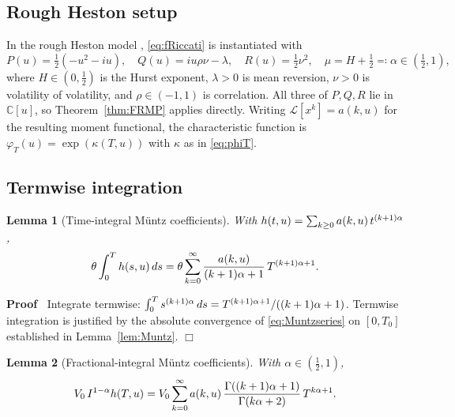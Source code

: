 \documentclass{article}
\newenvironment{proof}{\noindent\textbf{Proof\ }}{\hspace*{\fill}$\Box$\medskip}
\newtheorem{lemma}{Lemma}
\newcommand{\C}{\mathbb{C}}
\newcommand{\Lk}{\mathcal{L}}
\begin{document}
\subsection{Rough Heston setup}

In the rough Heston model {\cite{ElEuchRosenbaum2019}}, \eqref{eq:fRiccati} is
instantiated with
\begin{equation}
  P (u) = \tfrac{1}{2} (- u^2 - iu), \quad Q (u) = iu \rho \nu - \lambda,
  \quad R (u) = \tfrac{1}{2} \nu^2, \quad \mu = H + \tfrac{1}{2} \eqqcolon
  \alpha \in (\tfrac{1}{2}, 1), \label{eq:roughHparams}
\end{equation}
where $H \in (0, \tfrac{1}{2})$ is the Hurst exponent, $\lambda > 0$ is mean
reversion, $\nu > 0$ is volatility of volatility, and $\rho \in (- 1, 1)$ is
correlation. All three of $P, Q, R$ lie in $\C [u]$, so 
Theorem~\ref{thm:FRMP} applies directly. Writing $\Lk [x^k] = a (k, u)$ for
the resulting moment functional, the characteristic function is $\varphi_T (u)
= \exp (\kappa (T, u))$ with $\kappa$ as in \eqref{eq:phiT}.

\subsection{Termwise integration}

\begin{lemma}
  [Time-integral M{\"u}ntz coefficients]\label{lem:timeintegral}With $h (t, u)
  = \sum_{k \ge 0} a (k, u)  \hspace{0.17em} t^{(k + 1) \alpha}$,
  \begin{equation}
    \theta \int_0^T h (s, u)  \hspace{0.17em} ds = \theta \sum_{k =
    0}^{\infty} \frac{a (k, u)}{(k + 1) \alpha + 1}  \hspace{0.17em} T^{(k +
    1) \alpha + 1} . \label{eq:timeintegral}
  \end{equation}
\end{lemma}

\begin{proof}
  Integrate termwise: $\int_0^T s^{(k + 1) \alpha}  \hspace{0.17em} ds = T^{(k
  + 1) \alpha + 1} / ((k + 1) \alpha + 1)$. Termwise integration is justified
  by the absolute convergence of \eqref{eq:Muntzseries} on $[0, T_0]$
  established in  Lemma~\ref{lem:Muntz}.
\end{proof}

\begin{lemma}
  [Fractional-integral M{\"u}ntz coefficients]\label{lem:fracintegral}With
  $\alpha \in (\tfrac{1}{2}, 1)$,
  \begin{equation}
    V_0  \hspace{0.17em} I^{1 - \alpha} h (T, u) = V_0  \sum_{k = 0}^{\infty}
    a (k, u) \hspace{0.17em} \frac{\Gamma ((k + 1) \alpha + 1)}{\Gamma (k
    \alpha + 2)}  \hspace{0.17em} T^{k \alpha + 1} . \label{eq:fracintegral}
  \end{equation}
\end{lemma}
\end{document}
